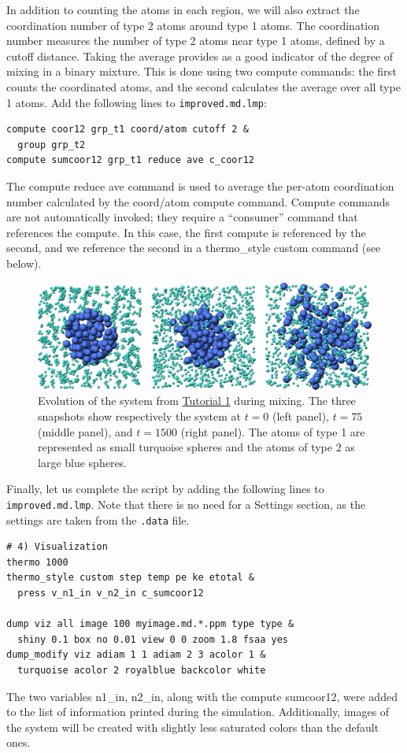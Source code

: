 \documentclass[9pt,tutorial]{livecoms}
\newcommand{\lmpcmd}[1]{\hspace{0pt}\colorbox{listing}{\textcolor{command}{\small{#1}}}\hspace{0pt}} %
\newcommand{\flecmd}[1]{\textcolor{command}{\texttt{#1}}} %
\begin{document}
In addition to counting the atoms in each region, we will also extract
the coordination number of type 2 atoms around type 1 atoms.  The
coordination number measures the number of type 2 atoms near
type 1 atoms, defined by a cutoff distance.  Taking the average provides
as a good indicator of the degree of mixing in a binary mixture.  This
is done using two \lmpcmd{compute} commands:  the first counts the
coordinated atoms, and the second calculates the average over all type 1
atoms.  Add the following lines to \flecmd{improved.md.lmp}:
\begin{lstlisting}
compute coor12 grp_t1 coord/atom cutoff 2 &
  group grp_t2
compute sumcoor12 grp_t1 reduce ave c_coor12
\end{lstlisting}
The \lmpcmd{compute reduce ave} command is used to average the per-atom
coordination number calculated by the \lmpcmd{coord/atom}
compute command.  Compute commands are not automatically invoked; they
require a ``consumer'' command that references the compute.  In this case, the
first compute is referenced by the second, and we reference the second
in a \lmpcmd{thermo\_style custom} command (see below).

\begin{figure}
\centering
\includegraphics[width=\linewidth]{LJ-evolution}
\caption{Evolution of the system from \hyperref[lennard-jones-label]{Tutorial 1}
during mixing.  The three snapshots show respectively the system
at $t=0$ (left panel), $t=75$ (middle panel), and $t=1500$ (right panel).  The
atoms of type 1 are represented as small turquoise spheres and the atoms of type 2
as large blue spheres.}
\label{fig:evolution-population}
\end{figure}

Finally, let us complete the script by adding the following lines to
\flecmd{improved.md.lmp}.  Note that there is no need for a \lmpcmd{Settings}
section, as the settings are taken from the \flecmd{.data} file.
\begin{lstlisting}
# 4) Visualization
thermo 1000
thermo_style custom step temp pe ke etotal &
  press v_n1_in v_n2_in c_sumcoor12

dump viz all image 100 myimage.md.*.ppm type type &
  shiny 0.1 box no 0.01 view 0 0 zoom 1.8 fsaa yes
dump_modify viz adiam 1 1 adiam 2 3 acolor 1 &
  turquoise acolor 2 royalblue backcolor white
\end{lstlisting}
The two variables \lmpcmd{n1\_in}, \lmpcmd{n2\_in}, along with the compute
\lmpcmd{sumcoor12}, were added to the list of information printed during
the simulation.  Additionally, images of the system will be created with
slightly less saturated colors than the default ones.
\end{document}
